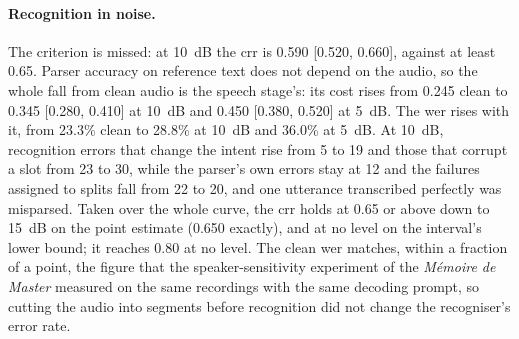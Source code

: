 \paragraph{Recognition in noise.} The criterion is missed: at 10~dB the \gls{crr} is 0.590 [0.520,
0.660], against at least 0.65. Parser accuracy on reference text does not depend on the audio, so
the whole fall from clean audio is the speech stage's: its cost rises from 0.245 clean to 0.345
[0.280, 0.410] at 10~dB and 0.450 [0.380, 0.520] at 5~dB. The \gls{wer} rises with it, from 23.3\%
clean to 28.8\% at 10~dB and 36.0\% at 5~dB. At 10~dB, recognition errors that change the intent
rise from 5 to 19 and those that corrupt a slot from 23 to 30, while the parser's own errors stay at
12 and the failures assigned to splits fall from 22 to 20, and one utterance transcribed perfectly
was misparsed. Taken over the whole curve, the \gls{crr}
holds at 0.65 or above down to 15~dB on the point estimate (0.650 exactly), and at no level on the
interval's lower bound; it reaches 0.80 at no level. The clean \gls{wer} matches, within a fraction
of a point, the figure that the speaker-sensitivity experiment of the \emph{M\'emoire de Master}
measured on the same recordings with the same decoding prompt, so cutting the audio into segments
before recognition did not change the recogniser's error rate.

